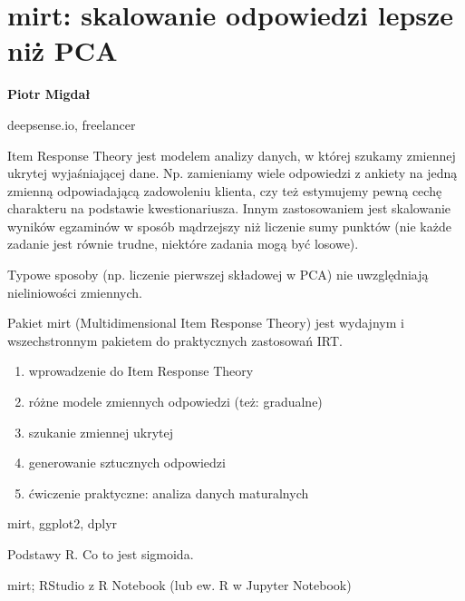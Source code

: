 \documentclass[\main/boa.tex]{subfiles}
\begin{document}
\section{mirt: skalowanie odpowiedzi lepsze niż PCA}

\begin{minipage}{0.915\textwidth}
\centering
{\bf {} Piotr Migdał}
\end{minipage}

\vskip 0.3cm

\begin{affiliations}
\begin{minipage}{0.915\textwidth}
\centering
\large deepsense.io, freelancer  \\[2pt]
\end{minipage}
\end{affiliations}

\vskip 0.8cm

\opiswarsztatu Item Response Theory jest modelem analizy danych, w której szukamy zmiennej ukrytej wyjaśniającej dane. Np. zamieniamy wiele odpowiedzi z ankiety na jedną zmienną odpowiadającą zadowoleniu klienta, czy też estymujemy pewną cechę charakteru na podstawie kwestionariusza. Innym zastosowaniem jest skalowanie wyników egzaminów w sposób mądrzejszy niż liczenie sumy punktów (nie każde zadanie jest równie trudne, niektóre zadania mogą być losowe).

Typowe sposoby (np. liczenie pierwszej składowej w PCA) nie uwzględniają nieliniowości zmiennych.

Pakiet mirt (Multidimensional Item Response Theory) jest wydajnym i wszechstronnym pakietem do praktycznych zastosowań IRT.

\planwarsztatu
\begin{enumerate}
\item wprowadzenie do Item Response Theory
\item różne modele zmiennych odpowiedzi (też: gradualne)
\item szukanie zmiennej ukrytej
\item generowanie sztucznych odpowiedzi
\item ćwiczenie praktyczne: analiza danych maturalnych
\end{enumerate}	 

\pakiety mirt, ggplot2, dplyr

\umiejetnosci Podstawy R. Co to jest sigmoida.

\wymagania mirt; RStudio z R Notebook (lub ew. R w Jupyter Notebook)
\end{document}
